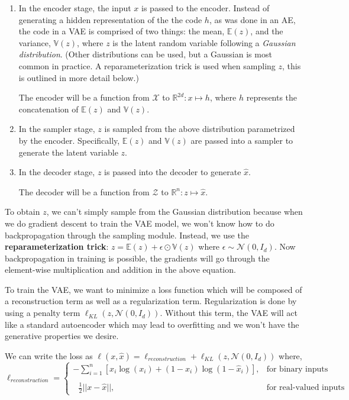 \documentclass{article}
\begin{document}
\begin{enumerate}
    \item In the encoder stage, the input $x$ is passed to the encoder. Instead of generating a hidden representation of the the code $h$, as was done in an AE, the code in a VAE is comprised of two things: the mean, $\mathbb{E}(z)$, and the variance, $\mathbb{V}(z)$, where $z$ is the latent random variable following a \textit{Gaussian distribution}. (Other distributions can be used, but a Gaussian is most common in practice. A reparameterization trick is used when sampling $z$, this is outlined in more detail below.)
    
    The encoder will be a function from $\mathcal{X}$ to $\mathbb{R}^{2d} : x \mapsto {h}$, where $h$ represents the concatenation of $\mathbb{E}({z})$ and $\mathbb{V}({z})$.
    
    \item In the sampler stage, $z$ is sampled from the above distribution parametrized by the encoder. Specifically, $\mathbb{E}({z})$ and $\mathbb{V}({z})$ are passed into a sampler to generate the latent variable $z$.
    
    \item In the decoder stage, $z$ is passed into the decoder to generate $\hat{x}$.
    
    The decoder will be a function from $\mathcal{Z}$ to $\mathbb{R}^{n}: z \mapsto \hat{x}$.
\end{enumerate}

To obtain $z$, we can't simply sample from the Gaussian distribution because when we do gradient descent to train the VAE model, we won’t know how to do backpropagation through the sampling module. Instead, we use the \textbf{reparameterization trick}: $z = \mathbb E (z) + \epsilon \odot \mathbb V(z)$ where $\epsilon\sim \mathcal{N}(0, {I}_d)$. Now backpropagation in training is possible, the gradients will go through the element-wise multiplication and addition in the above equation.

To train the VAE, we want to minimize a loss function which will be composed of a reconstruction term as well as a regularization term. Regularization is done by using a penalty term $\ell_{KL}(z, \mathcal N(0, I_d))$. Without this term, the VAE will act like a standard autoencoder which may lead to overfitting and we won’t have the generative properties we desire.

We can write the loss as $\ell(x, \hat x) = \ell_{reconstruction} + \ell_{KL}(z, \mathcal N(0, I_d))$ where,
\[
    \ell_{reconstruction}= 
    \begin{cases}
        -\displaystyle \sum_{i=1}^{n}[x_i \log(x_i) + (1-x_i)\log(1-\hat x_i)] , & \text{for binary inputs}\\ \\ 
        \ \ \ \displaystyle \frac{1}{2}||x -\hat x||, & \text{for real-valued inputs}
    \end{cases}
\]
\end{document}
